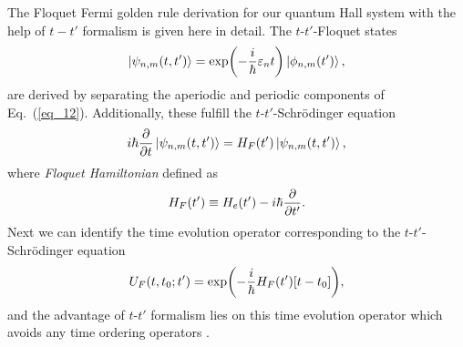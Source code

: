 The Floquet Fermi golden rule derivation for our quantum Hall system with the help of $t-t'$ formalism is given here in detail. The $t$-$t'$-Floquet states \cite{grifoni98,wackerl20}
\begin{equation} \label{eq_c1}
  \ket{\psi_{n,m}(t,t')} =
  \exp(-\frac{i}{\hbar}\varepsilon_{n} t)\ket{\phi_{n,m}(t')},
\end{equation}
are derived by separating the aperiodic and periodic components of Eq.~(\ref{eq_12}). Additionally, these fulfill the $t$-$t'$-Schrödinger equation \cite{grifoni98,wackerl20}
\begin{equation} \label{eq_c2}
  i \hbar \pdv{t}\ket{\psi_{n,m}(t,t')} =
  H_F(t') \ket{\psi_{n,m}(t,t')},
\end{equation}
where \textit{Floquet Hamiltonian} defined as
\begin{equation} \label{eq_c3}
  H_F(t') \equiv
  H_e(t') - i\hbar \pdv{t'}.
\end{equation}
Next we can identify the time evolution operator corresponding to the $t$-$t'$-Schrödinger equation
\begin{equation} \label{eq_c4}
  U_F(t,t_0;t') = \exp(-\frac{i}{\hbar}H_F(t')\qty[t-t_0]),
\end{equation}
and the advantage of $t$-$t'$ formalism lies on this time evolution operator which avoids any time ordering operators \cite{wackerl20}.

